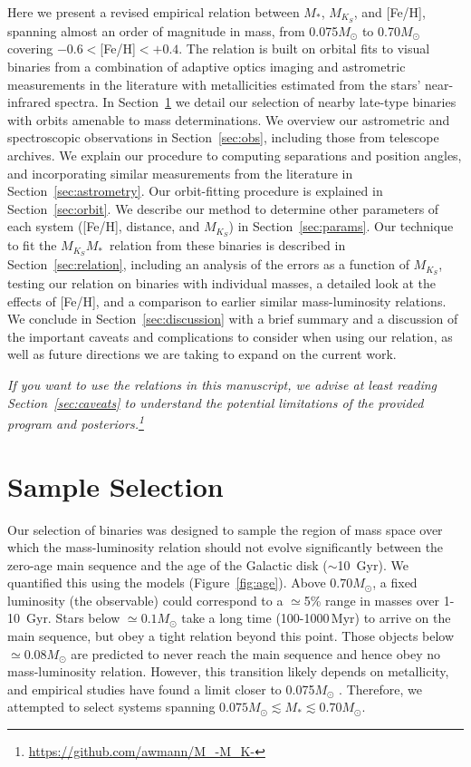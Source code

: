 \documentclass[twocolumn]{aastex62}
\newcommand{\mks}{$M_{K_S}$}
\newcommand{\mmk}{$M_{K_S}$\textendash$M_*$}
\begin{document}
Here we present a revised empirical relation between $M_*$, $M_{K_S}$, and [Fe/H], spanning almost an order of magnitude in mass, from 0.075$M_\odot$ to 0.70$M_\odot$ covering $-0.6<$[Fe/H]$<+0.4$. The relation is built on orbital fits to visual binaries from a combination of adaptive optics imaging and astrometric measurements in the literature with metallicities estimated from the stars' near-infrared spectra. In Section~\ref{sec:targets} we detail our selection of nearby late-type binaries with orbits amenable to mass determinations. We overview our astrometric and spectroscopic observations in Section~\ref{sec:obs}, including those from telescope archives. We explain our procedure to computing separations and position angles, and incorporating similar measurements from the literature in Section~\ref{sec:astrometry}. Our orbit-fitting procedure is explained in Section~\ref{sec:orbit}. We describe our method to determine other parameters of each system ([Fe/H], distance, and \mks) in Section~\ref{sec:params}. Our technique to fit the \mmk\ relation from these binaries is described in Section~\ref{sec:relation}, including an analysis of the errors as a function of \mks, testing our relation on binaries with individual masses, a detailed look at the effects of [Fe/H], and a comparison to earlier similar mass-luminosity relations. We conclude in Section~\ref{sec:discussion} with a brief summary and a discussion of the important caveats and complications to consider when using our relation, as well as future directions we are taking to expand on the current work.

\textit{If you want to use the relations in this manuscript, we advise at least reading Section~\ref{sec:caveats} to understand the potential limitations of the provided program and posteriors.\footnote{\href{https://github.com/awmann/M_-M_K-}{https://github.com/awmann/M\_-M\_K-}}}%


\section{Sample Selection}\label{sec:targets}
Our selection of binaries was designed to sample the region of mass space over which the mass-luminosity relation should not evolve significantly between the zero-age main sequence and the age of the Galactic disk ($\sim$10~Gyr). We quantified this using the \citet{BHAC15} models (Figure~\ref{fig:age}). Above $0.70M_\odot$, a fixed luminosity (the observable) could correspond to a $\simeq$5\% range in masses over 1-10\, Gyr. Stars below $\simeq0.1M_\odot$ take a long time (100-1000\,Myr) to arrive on the main sequence, but obey a tight relation beyond this point. Those objects below $\simeq0.08M_\odot$ are predicted to never reach the main sequence and hence obey no mass-luminosity relation. However, this transition likely depends on metallicity, and empirical studies have found a limit closer to 0.075$M_\odot$ \citep[e.g.,][]{Dieterich2014,Dupuy2017}. Therefore, we attempted to select systems spanning $0.075M_\odot \lesssim M_* \lesssim 0.70M_\odot$.
\end{document}
